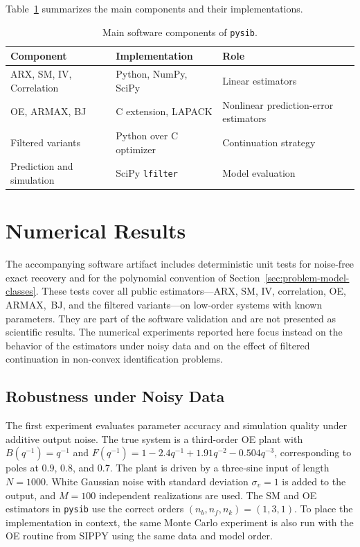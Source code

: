 \documentclass{ifacconf}
\begin{document}
Table~\ref{tab:architecture} summarizes the main components and their
implementations.

\begin{table}[t]
    \caption{Main software components of \texttt{pysib}.}
    \label{tab:architecture}
    \centering
    \footnotesize
    \setlength{\tabcolsep}{3pt}
    \begin{tabular}{p{}p{}p{}}
        \toprule
        Component & Implementation & Role \\
        \midrule
        ARX, SM, IV, Correlation & Python, NumPy, SciPy & Linear estimators \\
        OE, ARMAX, BJ & C extension, LAPACK & Nonlinear prediction-error estimators \\
        Filtered variants & Python over C optimizer & Continuation strategy \\
        Prediction and simulation & SciPy \texttt{lfilter} & Model evaluation \\
        \bottomrule
    \end{tabular}
\end{table}

\section{Numerical Results}
\label{sec:numerical-results}

The accompanying software artifact includes deterministic unit tests for
noise-free exact recovery and for the polynomial convention of
Section~\ref{sec:problem-model-classes}.  These tests cover all public
estimators---ARX, SM, IV, correlation, OE, ARMAX,~BJ, and the filtered
variants---on low-order systems with known parameters.
They are part of the software validation and are not presented as
scientific results.  The numerical experiments reported here focus instead
on the behavior of the estimators under noisy data and on the effect of
filtered continuation in non-convex identification problems.

\subsection{Robustness under Noisy Data}
\label{subsec:robustness-noisy-data}

The first experiment evaluates parameter accuracy and simulation quality
under additive output noise.  The true system is a third-order OE plant with
$B(q^{-1}) = q^{-1}$ and
$F(q^{-1}) = 1 - 2.4q^{-1} + 1.91q^{-2} - 0.504q^{-3}$,
corresponding to poles at $0.9$, $0.8$, and $0.7$.
The plant is driven by a three-sine input of length $N=1000$.
White Gaussian noise with standard deviation $\sigma_v = 1$ is added to the
output, and $M=100$ independent realizations are used.
The SM and OE estimators in \texttt{pysib} use the correct orders
$(n_b,n_f,n_k)=(1,3,1)$.  To place the implementation in context, the same
Monte Carlo experiment is also run with the OE routine from SIPPY using the
same data and model order.
\end{document}
